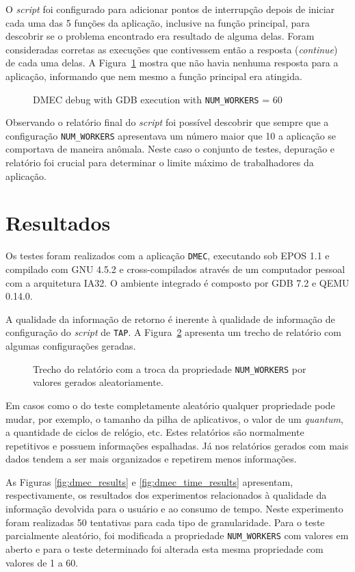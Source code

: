 \documentclass[conference]{IEEEtran}
\newcommand{\fig}[4][h]{
  \begin{figure}[#1] {\centering{\texttt{[image: fig/\#2]}}\par}
    \caption{#3\label{fig:#2}}
  \end{figure}
}
\begin{document}
O \textit{script} foi configurado para adicionar pontos de interrupção depois de iniciar cada uma das 5 funções da aplicação, inclusive na função principal, para descobrir se o problema encontrado era resultado de alguma delas. Foram consideradas corretas as execuções que contivessem então a resposta (\textit{continue}) de cada uma delas. A Figura~\ref{fig:gdb_dmec_60_workers} mostra que não havia nenhuma resposta para a aplicação, informando que nem mesmo a função principal era atingida. 

\fig{gdb_dmec_60_workers}{DMEC debug with GDB execution with \texttt{NUM\_WORKERS} = 60}{scale=.4}

Observando o relatório final do \textit{script} foi possível descobrir que sempre que a configuração \texttt{NUM\_WORKERS} apresentava um número maior que 10 a aplicação se comportava de maneira anômala. Neste caso o conjunto de testes, depuração e relatório foi crucial para determinar o limite máximo de trabalhadores da aplicação. 

\section{Resultados}
\label{sec:eval}
Os testes foram realizados com a aplicação \texttt{DMEC}, executando sob EPOS 1.1 e compilado com GNU 4.5.2 e cross-compilados através de um computador pessoal com a arquitetura IA32. O ambiente integrado é composto por GDB 7.2 e QEMU 0.14.0. 

A qualidade da informação de retorno é inerente à qualidade de informação de configuração do \textit{script} de \texttt{TAP}. A Figura~\ref{fig:comp_report_partial} apresenta um trecho de relatório com algumas configurações geradas.

\fig{comp_report_partial}{Trecho do relatório com a troca da propriedade \texttt{NUM\_WORKERS} por valores gerados aleatoriamente.}{scale = 0.55}

Em casos como o do teste completamente aleatório qualquer propriedade pode mudar, por exemplo, o tamanho da pilha de aplicativos, o valor de um \textit{quantum}, a quantidade de ciclos de relógio, etc. Estes relatórios são normalmente repetitivos e possuem informações espalhadas. Já nos relatórios gerados com mais dados tendem a ser mais organizados e repetirem menos informações.

As Figuras \ref{fig:dmec_results} e \ref{fig:dmec_time_results} apresentam, respectivamente, os resultados dos experimentos relacionados à qualidade da informação devolvida para o usuário e ao consumo de tempo. Neste experimento foram realizadas 50 tentativas para cada tipo de granularidade. Para o teste parcialmente aleatório, foi modificada a propriedade \texttt{NUM\_WORKERS} com valores em aberto e para o teste determinado foi alterada esta mesma propriedade com valores de 1 a 60.
\end{document}
